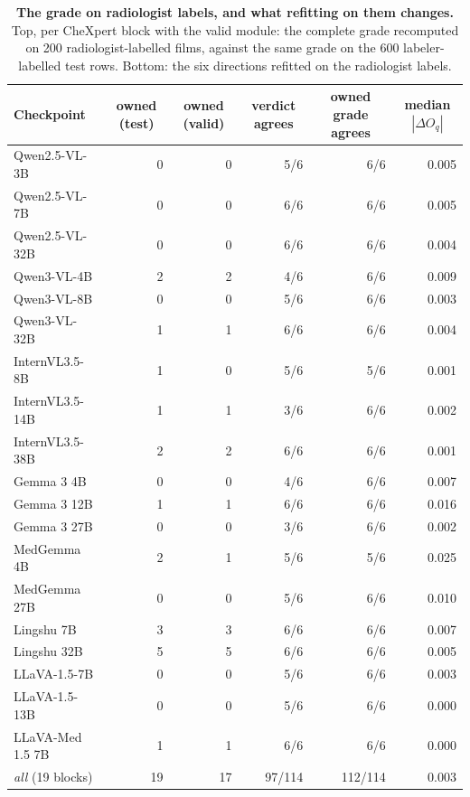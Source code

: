 \begin{table}[h]
\centering
\scriptsize
\setlength{\tabcolsep}{4pt}
\caption{\textbf{The grade on radiologist labels, and what refitting on them changes.} Top, per CheXpert block with the valid module: the complete grade recomputed on 200 radiologist-labelled films, against the same grade on the 600 labeler-labelled test rows. Bottom: the six directions refitted on the radiologist labels.}
\label{tab:cf-valid}
\begin{tabular}{lrrrrr}
\toprule
Checkpoint & \multicolumn{1}{c}{owned (test)} & \multicolumn{1}{c}{owned (valid)} & \multicolumn{1}{c}{verdict agrees} & \multicolumn{1}{c}{owned grade agrees} & \multicolumn{1}{c}{median $|\Delta O_q|$}\\
\midrule
Qwen2.5-VL-3B & 0 & 0 & 5/6 & 6/6 & 0.005 \\
Qwen2.5-VL-7B & 0 & 0 & 6/6 & 6/6 & 0.005 \\
Qwen2.5-VL-32B & 0 & 0 & 6/6 & 6/6 & 0.004 \\
Qwen3-VL-4B & 2 & 2 & 4/6 & 6/6 & 0.009 \\
Qwen3-VL-8B & 0 & 0 & 5/6 & 6/6 & 0.003 \\
Qwen3-VL-32B & 1 & 1 & 6/6 & 6/6 & 0.004 \\
InternVL3.5-8B & 1 & 0 & 5/6 & 5/6 & 0.001 \\
InternVL3.5-14B & 1 & 1 & 3/6 & 6/6 & 0.002 \\
InternVL3.5-38B & 2 & 2 & 6/6 & 6/6 & 0.001 \\
Gemma 3 4B & 0 & 0 & 4/6 & 6/6 & 0.007 \\
Gemma 3 12B & 1 & 1 & 6/6 & 6/6 & 0.016 \\
Gemma 3 27B & 0 & 0 & 3/6 & 6/6 & 0.002 \\
MedGemma 4B & 2 & 1 & 5/6 & 5/6 & 0.025 \\
MedGemma 27B & 0 & 0 & 5/6 & 6/6 & 0.010 \\
Lingshu 7B & 3 & 3 & 6/6 & 6/6 & 0.007 \\
Lingshu 32B & 5 & 5 & 6/6 & 6/6 & 0.005 \\
LLaVA-1.5-7B & 0 & 0 & 5/6 & 6/6 & 0.003 \\
LLaVA-1.5-13B & 0 & 0 & 5/6 & 6/6 & 0.000 \\
LLaVA-Med 1.5 7B & 1 & 1 & 6/6 & 6/6 & 0.000 \\
\midrule
\textit{all} (19 blocks) & 19 & 17 & 97/114 & 112/114 & 0.003 \\
\bottomrule
\end{tabular}


\end{table}
